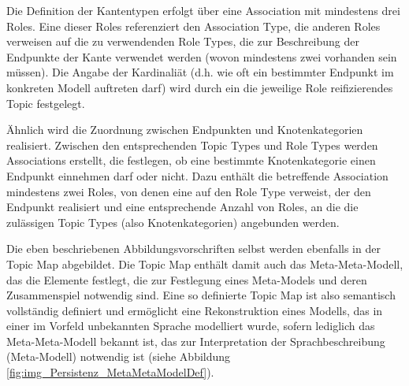 Die Definition der Kantentypen erfolgt über eine Association mit mindestens drei Roles. 
Eine dieser Roles referenziert den Association Type, die anderen Roles verweisen auf die zu verwendenden Role Types, die zur Beschreibung der Endpunkte der Kante verwendet werden (wovon mindestens zwei vorhanden sein müssen). Die Angabe der Kardinaliät (d.h. wie oft ein bestimmter Endpunkt im konkreten Modell auftreten darf) wird durch ein die jeweilige Role reifizierendes Topic festgelegt.

Ähnlich wird die Zuordnung zwischen Endpunkten und Knotenkategorien realisiert. Zwischen den entsprechenden Topic Types und Role Types werden Associations erstellt, die festlegen, ob eine bestimmte Knotenkategorie einen Endpunkt einnehmen darf oder nicht. Dazu enthält die betreffende Association mindestens zwei Roles, von denen eine auf den Role Type verweist, der den Endpunkt realisiert und eine entsprechende Anzahl von Roles, an die die zulässigen Topic Types (also Knotenkategorien) angebunden werden.

Die eben beschriebenen Abbildungsvorschriften selbst werden ebenfalls in der Topic Map abgebildet. Die Topic Map enthält damit auch das Meta-Meta-Modell, das die Elemente festlegt, die zur Festlegung eines Meta-Models und deren Zusammenspiel notwendig sind. Eine so definierte Topic Map ist also semantisch vollständig definiert und ermöglicht eine Rekonstruktion eines Modells, das in einer im Vorfeld unbekannten Sprache modelliert wurde, sofern lediglich das Meta-Meta-Modell bekannt ist, das zur Interpretation der Sprachbeschreibung (Meta-Modell) notwendig ist (siehe Abbildung \ref{fig:img_Persistenz_MetaMetaModelDef}).

